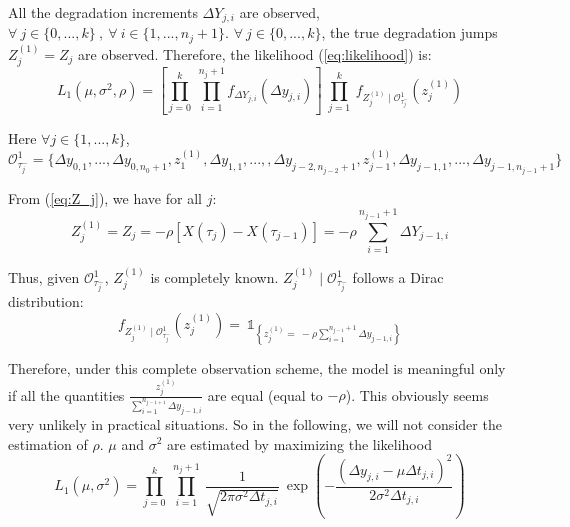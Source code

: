 All the degradation increments $\Delta Y_{j,i}$ are observed, $\forall\ j \in \{0,...,k\}\ ,\ \forall\ i \in \{1,...,n_j+1\}$. $\forall\ j \in \{0,...,k\}$, the true degradation jumps $Z_j^{(1)}=Z_j$ are observed. Therefore, the likelihood (\ref{eq:likelihood}) is:
\begin{equation}
L_1(\mu,\sigma^2,\rho)=\left[\prod\limits_{j=0}^k \ \prod\limits_{i=1}^{n_j+1} f_{\Delta Y_{j,i}} (\Delta y_{j,i})\right] \ \prod\limits_{j=1}^k \ f_{Z_j^{(1)} \mid \mathcal{O}_{\tau_j^-}^1}(z_j^{(1)})
\label{eq:like_scheme1}
\end{equation}

\noindent Here $\forall j \in \{1,...,k\}$,\\
$\mathcal{O}_{\tau_j^-}^1=\{\Delta y_{0,1},...,\Delta y_{0,n_0+1},z_1^{(1)},\Delta y_{1,1},...,,\Delta y_{j-2,n_{j-2}+1},z_{j-1}^{(1)},\Delta y_{j-1,1},...,\Delta y_{j-1,n_{j-1}+1}\}$

\noindent From (\ref{eq:Z_j}), we have for all $j$:
\begin{equation}
Z_j^{(1)} = Z_j  = -\rho \left[X(\tau_{j})-X(\tau_{j-1})\right] = -\rho \sum\limits_{i=1}^{n_{j-1}+1} \Delta Y_{j-1,i}
\end{equation}

\noindent Thus, given $\mathcal{O}^1_{\tau_j^-}$,  $Z_j^{(1)}$ is completely known. $Z_j^{(1)}\mid \mathcal{O}_{\tau_j^-}^1$ follows a Dirac distribution:
$$f_{Z_j^{(1)}\mid \mathcal{O}_{\tau_j^-}^1}(z_j^{(1)})= \ \mathds{1}_{\left\{z_j^{(1)}=\ -\rho \sum\limits_{i=1}^{n_{j-1}+1} \Delta y_{j-1,i}\right\}}$$

\noindent Therefore, under this complete observation scheme, the model is meaningful only if all the quantities $\frac{z_j^{(1)}}{\sum \limits_{i=1}^{n_{j-1+1}} \Delta y_{j-1,i}}$ are equal (equal to $-\rho$). This obviously seems very unlikely in practical situations. So in the following, we will not consider the estimation of $\rho$. $\mu$ and $\sigma^2$ are estimated by maximizing the likelihood
\begin{equation}
L_1 \left(\mu,\sigma^2 \right) 
=\prod \limits_{j=0}^{k} \  \prod \limits_{i=1}^{n_{j}+1} \ \frac{1}{\sqrt{2 \pi \sigma^2 \Delta t_{j,i}}} \ \exp\left( -\frac{(\Delta y_{j,i}-\mu \Delta t_{j,i})^2}{2\sigma^2 \Delta t_{j,i}} \right)
\end{equation}


